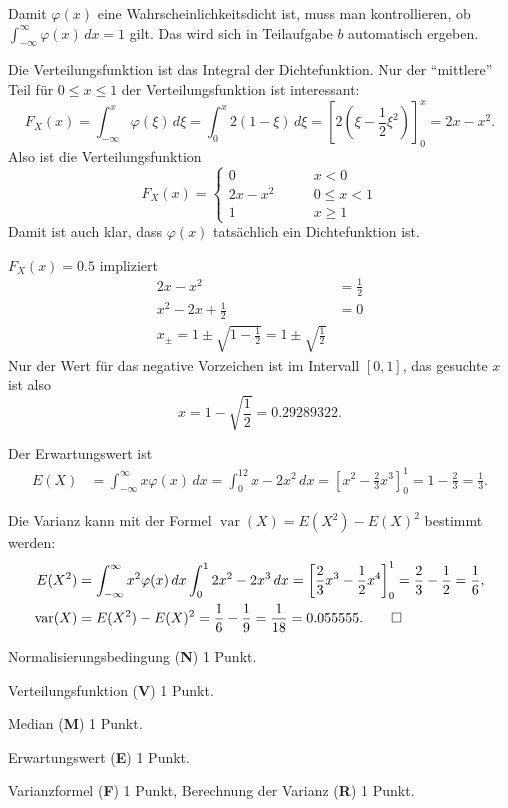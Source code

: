 \begin{loesung}
\begin{teilaufgaben}
\item Damit $\varphi(x)$ eine Wahrscheinlichkeitsdicht ist, muss man 
kontrollieren, ob $\int_{-\infty}^\infty\varphi(x)\,dx=1$ gilt. Das
wird sich in Teilaufgabe $b$ automatisch ergeben.
\item Die Verteilungsfunktion ist das Integral der Dichtefunktion.
Nur der ``mittlere'' Teil für $0\le x\le 1$
der Verteilungsfunktion ist interessant:
\[
F_X(x)=\int_{-\infty}^x\varphi(\xi)\,d\xi =\int_0^x2(1-\xi)\,d\xi=
\left[2(\xi-\frac12\xi^2)\right]_0^x=2x-x^2.
\]
Also ist die Verteilungsfunktion
\[
F_X(x)=\begin{cases}
     0&\qquad x < 0\\
2x-x^2&\qquad 0\le x < 1\\
     1&\qquad x \ge 1
\end{cases}
\]
Damit ist auch klar, dass $\varphi(x)$ tatsächlich ein Dichtefunktion ist.
\item $F_X(x)=0.5$ impliziert
\begin{align*}
2x-x^2&=\frac12\\
x^2-2x+\frac12&=0\\
x_\pm=1\pm\sqrt{1-\frac12}=1\pm\sqrt{\frac12}
\end{align*}
Nur der Wert für das negative Vorzeichen ist im Intervall $[0,1]$, das gesuchte
$x$ ist also
\[
x=1-\sqrt{\frac12}=0.29289322.
\]
\item
Der Erwartungswert ist
\begin{align*}
E(X)&=\int_{-\infty}^{\infty}x\varphi(x)\,dx
=\int_0^12x-2x^2\,dx=\left[ x^2-\frac23x^3\right]_0^1=1-\frac23=\frac13.
\end{align*}
\item Die Varianz kann mit der Formel
$\operatorname{var}(X)=E(X^2)-E(X)^2$ bestimmt werden:
\begin{align*}
E(X^2)&=\int_{-\infty}^{\infty}x^2\varphi(x)\,dx
\int_0^1 2x^2-2x^3\,dx
=\left[\frac23x^3-\frac12x^4\right]_0^1
=\frac23-\frac12=\frac16,
\\
\operatorname{var}(X)&=E(X^2)-E(X)^2=\frac16 - \frac19=\frac1{18}=0.055555.
\qedhere
\end{align*}
\end{teilaufgaben}
\end{loesung}

\begin{bewertung}
\begin{teilaufgaben}
\item Normalisierungsbedingung ({\bf N}) 1 Punkt.
\item Verteilungsfunktion ({\bf V}) 1 Punkt.
\item Median ({\bf M}) 1 Punkt.
\item Erwartungswert ({\bf E}) 1 Punkt.
\item Varianzformel ({\bf F}) 1 Punkt, Berechnung der Varianz ({\bf R}) 1 Punkt.
\end{teilaufgaben}
\end{bewertung}

